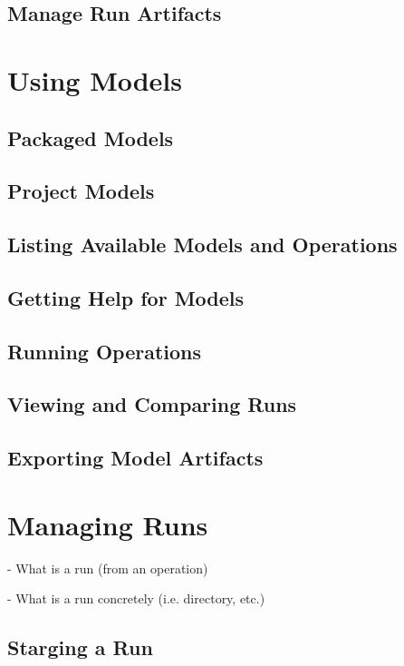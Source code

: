 \documentclass{article}
\begin{document}
\subsection{Manage Run Artifacts}

\section{Using Models}

\subsection{Packaged Models}

\subsection{Project Models}

\subsection{Listing Available Models and Operations}

\subsection{Getting Help for Models}

\subsection{Running Operations}

\subsection{Viewing and Comparing Runs}

\subsection{Exporting Model Artifacts}

\section{Managing Runs}

- What is a run (from an operation)

- What is a run concretely (i.e. directory, etc.)

\subsection{Starging a Run}
\end{document}
